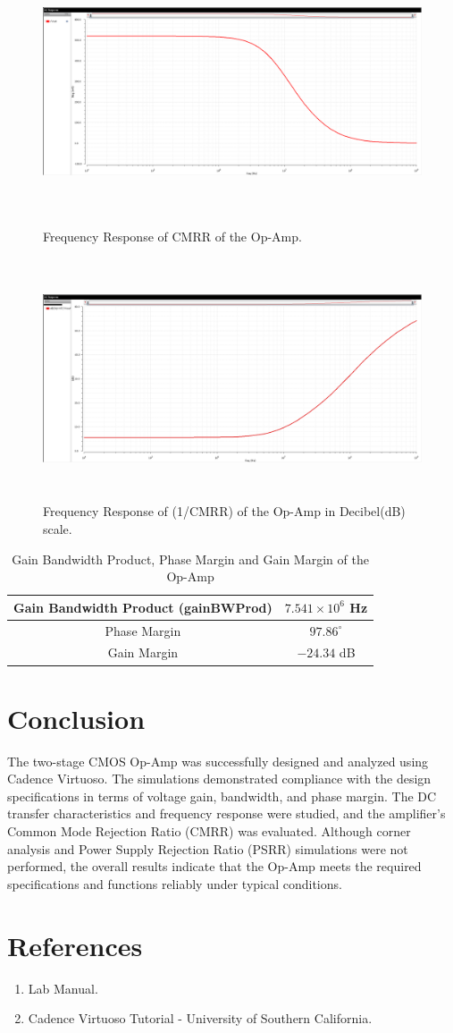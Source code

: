 \documentclass[11pt]{article}
\begin{document}
\newpage
\begin{figure}[!h]
    \centering
    \includegraphics[height=2.8in]{1cmrr.png}
    \caption{Frequency Response of CMRR of the Op-Amp.}
    \includegraphics[height=2.8in]{cmrr.png}
    \caption{Frequency Response of (1/CMRR) of the Op-Amp in Decibel(dB) scale.}
\end{figure}
\begin{table}[h!]
    \centering
    \begin{tabular}{|c|c|}
        \hline
        Gain Bandwidth Product (gainBWProd) & $7.541\times10^{6}$ Hz \\
        \hline
        Phase Margin                        & $97.86^\circ$          \\
        \hline
        Gain Margin                         & $-24.34$ dB            \\
        \hline
    \end{tabular}
    \caption{Gain Bandwidth Product, Phase Margin and Gain Margin of the Op-Amp}
\end{table}
\section{Conclusion}
The two-stage CMOS Op-Amp was successfully designed and analyzed using Cadence Virtuoso. The simulations demonstrated compliance with the design specifications in terms of voltage gain, bandwidth, and phase margin. The DC transfer characteristics and frequency response were studied, and the amplifier's Common Mode Rejection Ratio (CMRR) was evaluated. Although corner analysis and Power Supply Rejection Ratio (PSRR) simulations were not performed, the overall results indicate that the Op-Amp meets the required specifications and functions reliably under typical conditions.
\section{References}
\begin{enumerate}
    \item Lab Manual.
    \item Cadence Virtuoso Tutorial - University of Southern California.
\end{enumerate}
\end{document}

